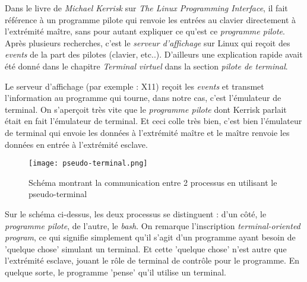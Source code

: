 Dans le livre de \textit{Michael Kerrisk} sur \textit{The Linux Programming Interface}, il fait référence à un programme pilote qui renvoie les entrées au clavier directement à l'extrémité maître, sans pour autant expliquer ce qu'est ce \textit{programme pilote}. Après plusieurs recherches, c'est le \textit{serveur d'affichage} sur Linux qui reçoit des \textit{events} de la part des pilotes (clavier, etc..). D'ailleurs une explication rapide avait été donné dans le chapitre \textit{Terminal virtuel} dans la section \textit{pilote de terminal}.

\hfill \break

Le serveur d'affichage (par exemple : X11) reçoit les \textit{events} et transmet l'information au programme qui tourne, dans notre cas, c'est l'émulateur de terminal. On s'aperçoit très vite que le \textit{programme pilote} dont Kerrisk parlait était en fait l'émulateur de terminal. Et ceci colle très bien, c'est bien l'émulateur de terminal qui envoie les données à l'extrémité maître et le maître renvoie les données en entrée à l'extrémité esclave.

\begin{figure}[h]
	\centering
	\texttt{[image: pseudo-terminal.png]}
	\caption{Schéma montrant la communication entre 2 processus en utilisant le pseudo-terminal}
\end{figure}

Sur le schéma ci-dessus, les deux processus se distinguent : d'un côté, le \textit{programme pilote}, de l'autre, le \textit{bash}. On remarque l'inscription \textit{terminal-oriented program}, ce qui signifie simplement qu'il s'agit d'un programme ayant besoin de 'quelque chose' simulant un terminal. Et cette 'quelque chose' n'est autre que l'extrémité esclave, jouant le rôle de terminal de contrôle pour le programme. En quelque sorte, le programme 'pense' qu'il utilise un terminal.
